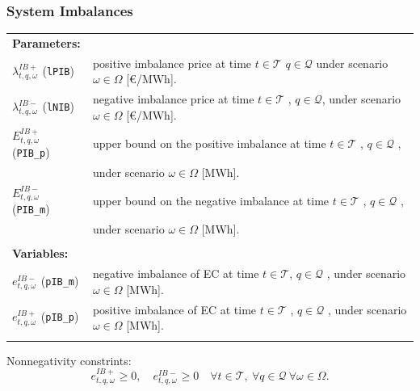 \subsubsection{System Imbalances}

\begin{tabularx}{\textwidth}{l X}
    \textbf{Parameters:} \\
    $\lambda^{IB+}_{t,q, \omega}$ (\texttt{lPIB}) & positive imbalance price at time $t \in \mathcal{T}$ $q \in \mathcal{Q}$ under scenario $\omega \in \Omega$ [\euro/MWh]. \\
	$\lambda^{IB-}_{t,q, \omega}$ (\texttt{lNIB}) & negative imbalance price at time $t \in \mathcal{T}$ , $q \in \mathcal{Q}$, under scenario $\omega \in \Omega$ [\euro/MWh]. \\
    $E^{IB+}_{t,q, \omega}$ (\texttt{PIB\_p}) & upper bound on the positive imbalance at time $t \in \mathcal{T}$ , $q \in \mathcal{Q}$ ,\\
    & under scenario $\omega \in \Omega$ [MWh]. \\
	$E^{IB-}_{t,q, \omega}$ (\texttt{PIB\_m}) & upper bound on the negative imbalance at time $t \in \mathcal{T}$ , $q \in \mathcal{Q}$ , \\ 
	& under scenario $\omega \in \Omega$ [MWh]. \\
    \\ 
       
    \textbf{Variables:} \\
    $e_{t,q, \omega}^{IB-}$ (\texttt{pIB\_m}) & negative imbalance of EC at time $t \in \mathcal{T}$, $q \in \mathcal{Q}$ , under scenario $\omega \in \Omega$ [MWh].	\\
	$e_{t,q, \omega}^{IB+}$ (\texttt{pIB\_p}) & positive imbalance of EC at time $t \in \mathcal{T}$ , $q \in \mathcal{Q}$ , under scenario $\omega \in \Omega$ [MWh].	\\ 
    \\
\end{tabularx}

Nonnegativity constrints:
\begin{equation} \label{EQ:IBVarDef2}
    e_{t,q, \omega}^{IB+} \geq 0, \quad e_{t, q,\omega}^{IB-} \geq 0 \quad \forall t \in \mathcal{T}, \ \forall q \in \mathcal{Q}\ \forall \omega \in \Omega.
\end{equation}

